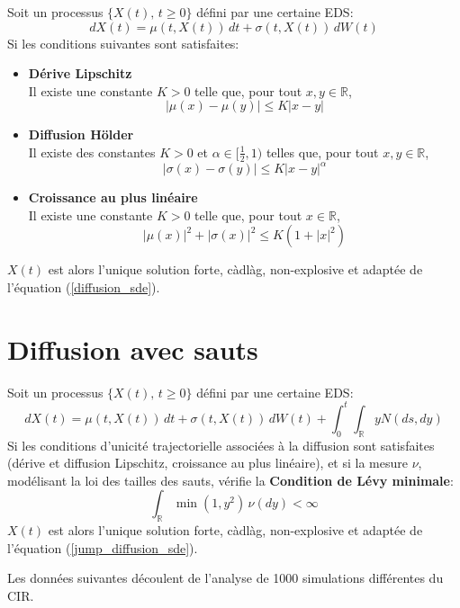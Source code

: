 Soit un processus \( \{X(t),\, t \geq 0\} \) défini par une certaine \ac{EDS}:
\begin{equation}\label{diffusion_sde}
    dX(t) = \mu(t,X(t))\,dt + \sigma(t,X(t))\,dW(t)
\end{equation}
Si les conditions suivantes sont satisfaites:
\begin{itemize}
    \item \textbf{Dérive Lipschitz} \\
    Il existe une constante \( K > 0 \) telle que, pour tout \( x,y \in \mathds{R} \),
    \[
    |\mu(x)-\mu(y)|\leq K|x-y|
    \]
    \item \textbf{Diffusion Hölder} \\
    Il existe des constantes \( K > 0 \) et \(\alpha\in[\frac{1}{2},1)\) telles que, pour tout \( x,y \in \mathds{R} \),
    \[
    |\sigma(x)-\sigma(y)|\leq K{|x-y|}^\alpha
    \]
    \item \textbf{Croissance au plus linéaire} \\
    Il existe une constante \( K > 0 \) telle que, pour tout \( x \in \mathds{R} \),
    \[
    |\mu(x)|^2 + |\sigma(x)|^2 \leq K(1 + |x|^2)
    \]
\end{itemize}
$X(t)$ est alors l'unique solution forte, càdlàg, non-explosive  et adaptée de l'équation (\ref{diffusion_sde}).

\section*{Diffusion avec sauts}
Soit un processus \( \{X(t),\, t \geq 0\} \) défini par une certaine \ac{EDS}:
\begin{equation}\label{jump_diffusion_sde}
    dX(t) = \mu(t, X(t))\,dt + \sigma(t, X(t))\,dW(t) + \int_0^t\int_{\mathds{R}} yN(ds,dy)
\end{equation}
Si les conditions d'unicité trajectorielle associées à la diffusion sont satisfaites (dérive et diffusion Lipschitz, croissance au plus linéaire), et si la mesure \( \nu \), modélisant la loi des tailles des sauts, vérifie la \textbf{Condition de Lévy minimale}:
\[
\int_{\mathds{R}}\min(1, y^2)\, \nu(dy) < \infty
\]
$X(t)$ est alors l'unique solution forte, càdlàg, non-explosive et adaptée de l'équation (\ref{jump_diffusion_sde}).

\label{control_simulations}

Les données suivantes découlent de l'analyse de 1000 simulations différentes du \acs{CIR}. 


